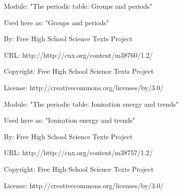       \par\vspace{9pt}\noindent\begin{minipage}{\textwidth}
      Module: "The periodic table: Groups and periods" \par\nopagebreak\noindent
      Used here as: "Groups and periods" \par\nopagebreak\noindent
        By: Free High School Science Texts Project\par\nopagebreak\noindent
      URL: http://http://cnx.org/content/m38760/1.2/\par\nopagebreak\noindent
      \par\nopagebreak\noindent
      Copyright: Free High School Science Texts Project\par\nopagebreak\noindent
      License:  http://creativecommons.org/licenses/by/3.0/\par\nopagebreak\noindent
      \par\end{minipage}
      \par\vspace{9pt}\noindent\begin{minipage}{\textwidth}
      Module: "The periodic table: Ionisation energy and trends" \par\nopagebreak\noindent
      Used here as: "Ionisation energy and trends" \par\nopagebreak\noindent
        By: Free High School Science Texts Project\par\nopagebreak\noindent
      URL: http://http://cnx.org/content/m38757/1.2/\par\nopagebreak\noindent
      \par\nopagebreak\noindent
      Copyright: Free High School Science Texts Project\par\nopagebreak\noindent
      License:  http://creativecommons.org/licenses/by/3.0/\par\nopagebreak\noindent
      \par\end{minipage}
